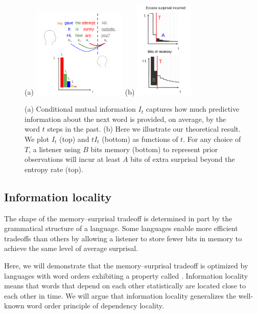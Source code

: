 \begin{figure}
	(a)
\includegraphics[width=0.4\textwidth]{figures-gdrive/mi-distance.pdf}
	(b)
\includegraphics[width=0.25\textwidth]{figures-gdrive/theorem.pdf}
	\caption{
		(a) Conditional mutual information $I_t$ captures how much predictive information about the next word is provided, on average, by the word $t$ steps in the past.
		(b) Here we illustrate our theoretical result. We plot $I_t$ (top) and $tI_t$ (bottom) as functions of $t$. For any choice of $T$, a listener using $B$ bits memory (bottom) to represent prior observations will incur at least $A$ bits of extra surprisal beyond the entropy rate (top). 
}\label{fig:theorem}
\end{figure}

\subsection{Information locality}
\label{sec:infoloc}\label{sec:tradeoff}

The shape of the memory--surprisal tradeoff is determined in part by the grammatical structure of a language.
Some languages enable more efficient tradeoffs than others by allowing a listener to store fewer bits in memory to achieve the same level of average surprisal.

Here, we will demonstrate that the memory--surprisal tradeoff is optimized by languages with word orders exhibiting a property called . Information locality means that words that depend on each other statistically are located close to each other in time. We will argue that information locality generalizes the well-known word order principle of dependency locality.

